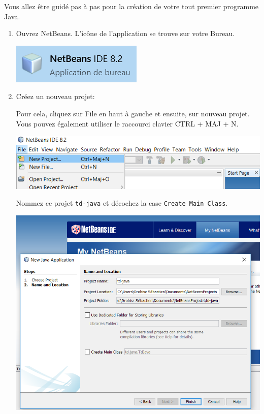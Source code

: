 \documentclass[a4paper,11pt]{article}
\begin{document}
	Vous allez être guidé pas à pas pour la création de votre tout premier programme Java.
	\begin{enumerate}
		\item Ouvrez NetBeans. L'icône de l'application se trouve sur votre Bureau. 
		
		\bigskip
			\begin{center}
				\includegraphics{images/nb_icone}
			\end{center}


		\item Créez un nouveau projet: 
		
		Pour cela, cliquez sur \og File \fg en haut à gauche et ensuite, sur nouveau projet. 
		Vous pouvez également utiliser le raccourci clavier CTRL + MAJ + N.
					\bigskip
			\begin{center}
				\includegraphics[width=\textwidth]{images/nb_newproject}
			\end{center}
		Nommez ce projet \texttt{td-java} et décochez la case \texttt{Create Main Class}.
			\begin{center}
				\includegraphics[width=\textwidth]{images/nb_newproject_name}
			\end{center}
			

\end{enumerate}
\end{document}
